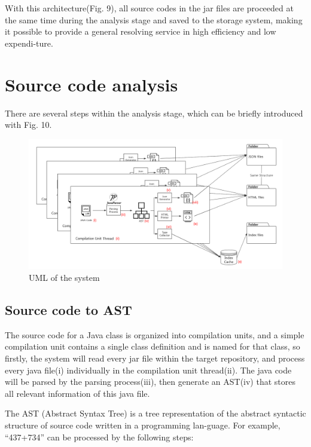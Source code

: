 \documentclass[runningheads]{llncs}
\begin{document}
With this architecture(Fig. 9), all source codes in the jar files are proceeded at the same time during the analysis stage and saved to the storage system, making it possible to provide a general resolving service in high efficiency and low expendi-ture.

\section{Source code analysis}

There are several steps within the analysis stage, which can be briefly introduced with Fig. 10.

\begin{figure}[H]
	\centering
	\includegraphics[width=12cm]{pic/AnalysisFlow.png}
	\caption{UML of the system}
	\label{Source code analysis process}
\end{figure}

\subsection{Source code to AST}

The source code for a Java class is organized into compilation units, and a simple compilation unit contains a single class definition and is named for that class\cite{learningJava_2013}, so firstly, the system will read every jar file within the target repository, and process every java file(i) individually in the compilation unit thread(ii). The java code will be parsed by the parsing process(iii), then generate an AST(iv) that stores all relevant information of this java file.

The AST (Abstract Syntax Tree) is a tree representation of the abstract syntactic structure of source code written in a programming lan-guage.\cite{AST_introduction} For example, “437+734” can be processed by the following steps:
\end{document}
